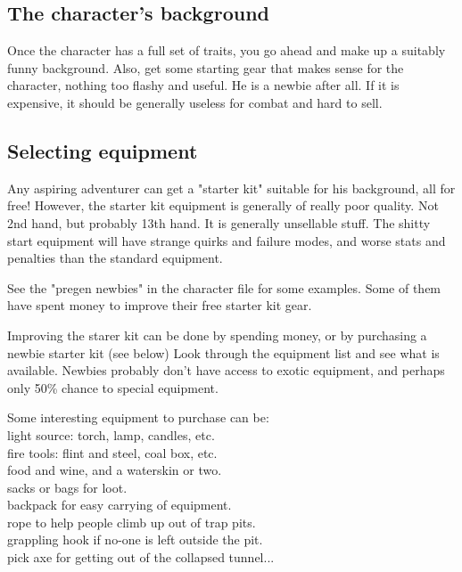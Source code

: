 \subsection*{The character's background}
Once the character has a full set of traits, you go ahead and make up a suitably funny background. Also, get some starting gear that makes sense for the character, nothing too flashy and useful. He is a newbie after all. If it is expensive, it should be generally useless for combat and hard to sell.


%


\subsection*{Selecting equipment}
Any aspiring adventurer can get a "starter kit" suitable for his background, all for free! However, the starter kit equipment is generally of really poor quality. Not 2nd hand, but probably 13th hand. It is generally unsellable stuff. The shitty start equipment will have strange quirks and failure modes, and worse stats and penalties than the standard equipment.

See the "pregen newbies" in the character file for some examples. Some of them have spent money to improve their free starter kit gear.


Improving the starer kit can be done by spending money, or by purchasing a newbie starter kit (see below) Look through the equipment list and see what is available. Newbies probably don't have access to exotic equipment, and perhaps only 50\% chance to special equipment.

Some interesting equipment to purchase can be: \\
light source: torch, lamp, candles, etc. \\
fire tools: flint and steel, coal box, etc. \\
food and wine, and a waterskin or two. \\
sacks or bags for loot. \\
backpack for easy carrying of equipment. \\
rope to help people climb up out of trap pits. \\
grappling hook if no-one is left outside the pit. \\
pick axe for getting out of the collapsed tunnel...

